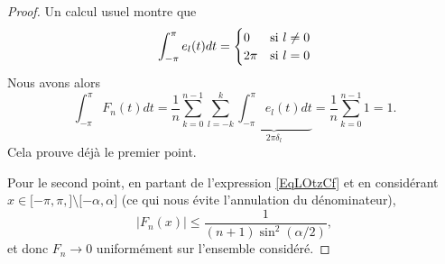 \begin{proof}
    Un calcul usuel montre que
    \begin{equation}
        \int_{-\pi}^{\pi}e_l(t)dt=\begin{cases}
            0    &   \text{si \( l\neq 0\)}\\
            2\pi    &    \text{si \( l=0\)}
        \end{cases}
    \end{equation}
    Nous avons alors
    \begin{equation}
        \int_{-\pi}^{\pi}F_n(t)dt=\frac{1}{ n }\sum_{k=0}^{n-1}\sum_{l=-k}^k\underbrace{\int_{-\pi}^{\pi}e_l(t)dt}_{2\pi\delta_l}=\frac{1}{ n }\sum_{k=0}^{n-1}1=1.
    \end{equation}
    Cela prouve déjà le premier point.

    Pour le second point, en partant de l'expression \eqref{EqLOtzCf} et en considérant \( x\in\mathopen[ -\pi, \pi ,  \mathclose]\setminus\mathopen[ -\alpha , \alpha \mathclose]\) (ce qui nous évite l'annulation du dénominateur),
    \begin{equation}
        | F_n(x) |\leq\frac{1}{ (n+1)\sin^2(\alpha/2) },
    \end{equation}
    et donc \( F_n\to 0\) uniformément sur l'ensemble considéré.


\end{proof}
